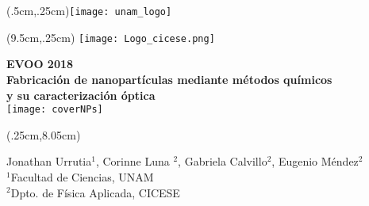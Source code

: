 \documentclass{beamer}
\begin{document}
\begin{frame} 
\begin{textblock*}{1.8cm}(.5cm,.25cm)\texttt{[image: unam\_logo]}\end{textblock*}
\begin{textblock*}{1.8cm}(9.5cm,.25cm) \texttt{[image: Logo\_cicese.png]} \end{textblock*}


\centering

\vspace*{2.cm}
{\color{ultramarine} \Large\textbf{ EVOO 2018\\  Fabricación de nanopartículas mediante métodos químicos\\ y su caracterización óptica }}\\
\vspace*{.25cm}
\texttt{[image: coverNPs]}\\




\begin{textblock*}{15cm}(.25cm,8.05cm) 
\begin{flushleft} \scriptsize
Jonathan Urrutia$^1$, Corinne Luna $^2$, Gabriela Calvillo$^2$, Eugenio Méndez$^2$\\ $^1$Facultad de Ciencias, UNAM \\ $^2$Dpto. de Física Aplicada, CICESE
\end{flushleft}
\end{textblock*}

\end{frame}


\end{document}
